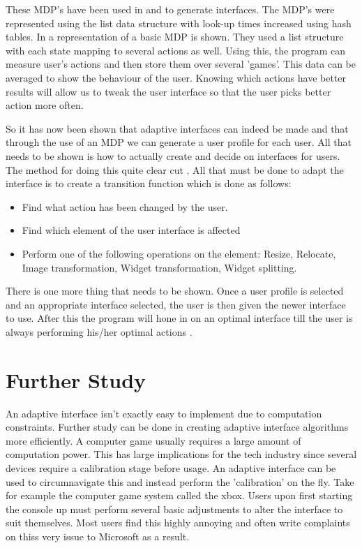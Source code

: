 \documentclass[11pt]{article}
\begin{document}
These MDP's have been used in \citep{ramamoorthylatent} and \citep{rosman2014user} to generate interfaces. The MDP's were represented using the list data structure with look-up times increased using hash tables. In \citep{andrade2005challenge} a representation of a basic MDP is shown. They used a list structure with each state mapping to several actions as well. Using this, the program can measure user's actions and then store them over several 'games'. This data can be averaged to show the behaviour of the user. Knowing which actions have better results will allow us to tweak the user interface so that the user picks better action more often.
\vspace{6.0 mm}

So it has now been shown that adaptive interfaces can indeed be made and that through the use of an MDP we can generate a user profile for each user. All that needs to be shown is how to actually create and decide on interfaces for users. The method for doing this quite clear cut \citep{dessart2011showing}. All that must be done to adapt the interface is to create a transition function which is done as follows:
\begin{itemize}
\item Find what action has been changed by the user.
\item Find which element of the user interface is affected
\item Perform one of the following operations on the element: Resize, Relocate, Image transformation, Widget transformation, Widget splitting.
\end{itemize}
\vspace{6.0 mm}
There is one more thing that needs to be shown. Once a user profile is selected and an appropriate interface selected, the user is then given the newer interface to use. After this the program will hone in on an optimal interface till the user is always performing his/her optimal actions \citep{dessart2011showing} \citep{andrade2005challenge}.

\clearpage


\section{Further Study}

An adaptive interface isn't exactly easy to implement due to computation constraints. Further study can be done in creating adaptive interface algorithms more efficiently. A computer game usually requires a large amount of computation power. This has large implications for the tech industry since several devices require a calibration stage before usage. An adaptive interface can be used to circumnavigate this and instead perform the 'calibration' on the fly. Take for example the computer game system called the xbox. Users upon first starting the console up must perform several basic adjustments to alter the interface to suit themselves. Most users find this highly annoying and often write complaints on thiss very issue to Microsoft as a result.
\vspace{6.0 mm}
\end{document}
